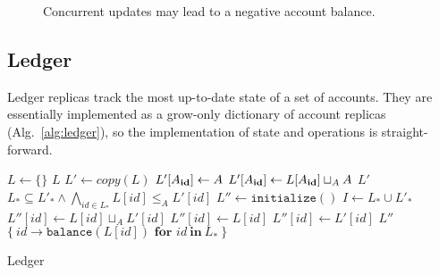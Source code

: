 \documentclass[9pt, oneside]{article}   	%
\begin{document}
\begin{figure}

\caption{Concurrent updates may lead to a negative account balance.}
\label{fig:account-negative-bal}
\end{figure}


\subsection{Ledger}
\label{sec:ledger}

Ledger replicas track the most up-to-date state of a set of accounts. They are essentially implemented as a grow-only dictionary of account replicas (Alg.~\ref{alg:ledger}), so the implementation of state and operations is straight-forward.

\begin{algorithm}
\begin{algorithmic}[1]
    	\State $L \leftarrow \{ \}$ 
    	\State \Return $L$
    \EndFunction
    \State
        \State $L' \leftarrow \textit{copy}(L)$ 
		\State $L'[A_{\scriptsize\textbf{id}}] \leftarrow A$
	\Else
		\State $L'[A_{\scriptsize\textbf{id}}] \leftarrow L[A_{\scriptsize\textbf{id}}] \sqcup_A A$ 
	\EndIf
	\State \Return $L'$
    \EndFunction
    \State
    	\State \Return $L_* \subseteq L'_* \wedge \bigwedge_{id \in L_*} L[id] \leq_A L'[id]$ 
    \EndFunction
    \State
        \State $L'' \leftarrow \texttt{initialize}()$
        \State $I \leftarrow L_* \cup L'_*$
			\State $L''[id] \leftarrow  L[id] \sqcup_A L'[id]$  
			\State $L''[id] \leftarrow L[id]$
		\Else
			\State $L''[id] \leftarrow L'[id]$	
		\EndIf
	\EndFor
	\State \Return $L''$	
    \EndFunction
    \State
        \State \Return $\{~ id \rightarrow \texttt{balance}(L[id]) \textbf{~for~} id ~\textbf{in}~ L_* ~\}$  
    \EndFunction
\end{algorithmic}
\caption{\label{alg:ledger} Ledger}
\end{algorithm}
\end{document}
